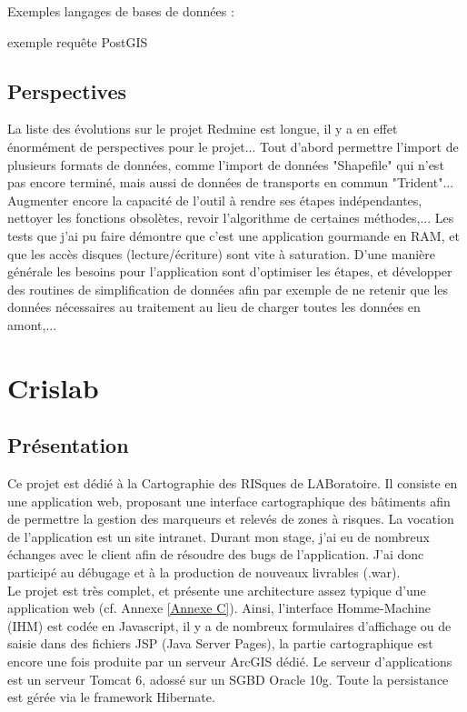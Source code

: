 \begin{itemize}
Exemples langages de bases de données :

exemple requête PostGIS




\subsection{Perspectives}

La liste des évolutions sur le projet Redmine est longue, il y a en effet énormément de perspectives pour le projet... Tout d'abord permettre l'import de plusieurs formats de données, comme l'import de données "Shapefile" qui n'est pas encore terminé, mais aussi de données de transports en commun "Trident"... Augmenter encore la capacité de l'outil à rendre ses étapes indépendantes, nettoyer les fonctions obsolètes, revoir l'algorithme de certaines méthodes,...
Les tests que j'ai pu faire démontre que c'est une application gourmande en RAM, et que les accès disques (lecture/écriture) sont vite à saturation. D'une manière générale les besoins pour l'application sont d'optimiser les étapes, et développer des routines de simplification de données afin par exemple de ne retenir que les données nécessaires au traitement au lieu de charger toutes les données en amont,... \\


\section{Crislab}\label{Divers}

\subsection{Présentation} 

Ce projet est dédié à la Cartographie des RISques de LABoratoire. Il consiste en une application web, proposant une interface cartographique des bâtiments afin de permettre la gestion des marqueurs et relevés de zones à risques. La vocation de l'application est un site intranet. Durant mon stage, j'ai eu de nombreux échanges avec le client afin de résoudre des bugs de l'application. J'ai donc participé au débugage et à la production de nouveaux livrables (.war).\\

Le projet est très complet, et présente une architecture assez typique d'une application web (cf. Annexe \ref{Annexe C}). Ainsi, l'interface Homme-Machine (IHM) est codée en Javascript, il y a de nombreux formulaires d'affichage ou de saisie dans des fichiers JSP  (Java Server Pages), la partie cartographique est encore une fois produite par un serveur ArcGIS dédié. Le serveur d'applications est un serveur Tomcat 6, adossé sur un SGBD Oracle 10g. Toute la persistance est gérée via le framework Hibernate.\\


\end{itemize}
